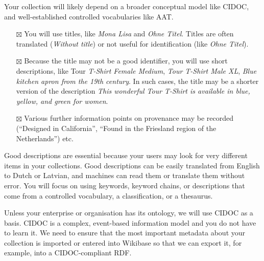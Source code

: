 \documentclass[
  letterpaper,
  DIV=11,
  numbers=noendperiod]{scrreprt}
\begin{document}
\begin{tcolorbox}[enhanced jigsaw, opacityback=0, bottomrule=.15mm, rightrule=.15mm, toptitle=1mm, breakable, colbacktitle=quarto-callout-tip-color!10!white, colback=white, title=\textcolor{quarto-callout-tip-color}{\faLightbulb}\hspace{0.5em}{Webshops, galleries, museums}, leftrule=.75mm, toprule=.15mm, left=2mm, arc=.35mm, colframe=quarto-callout-tip-color-frame, coltitle=black, titlerule=0mm, bottomtitle=1mm, opacitybacktitle=0.6]

Your collection will likely depend on a broader conceptual model like
CIDOC, and well-established controlled vocabularies like AAT.

\begin{itemize}
\item[$\boxtimes$]
  You will use titles, like \emph{Mona Lisa} and \emph{Ohne Titel}.
  Titles are often translated (\emph{Without title}) or not useful for
  identification (like \emph{Ohne Titel}).
\item[$\boxtimes$]
  Because the title may not be a good identifier, you will use short
  descriptions, like Tour \emph{T-Shirt Female Medium}, \emph{Tour
  T-Shirt Male XL}, \emph{Blue kitchen apron from the 19th century}. In
  such cases, the title may be a shorter version of the description
  \emph{This wonderful Tour T-Shirt is available in blue, yellow, and
  green for women}.
\item[$\boxtimes$]
  Various further information points on provenance may be recorded
  (``Designed in California'', ``Found in the Friesland region of the
  Netherlands'') etc.
\end{itemize}

Good descriptions are essential because your users may look for very
different items in your collections. Good descriptions can be easily
translated from English to Dutch or Latvian, and machines can read them
or translate them without error. You will focus on using keywords,
keyword chains, or descriptions that come from a controlled vocabulary,
a classification, or a thesaurus.

Unless your enterprise or organisation has its ontology, we will use
CIDOC as a basis. CIDOC is a complex, event-based information model and
you do not have to learn it. We need to ensure that the most important
metadata about your collection is imported or entered into Wikibase so
that we can export it, for example, into a CIDOC-compliant RDF.

\end{tcolorbox}
\end{document}

